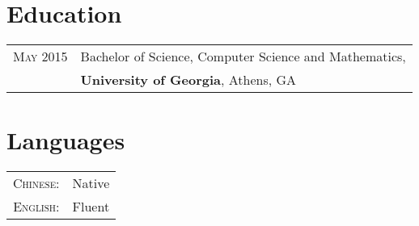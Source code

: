 \documentclass[a4paper,10pt]{article}
\begin{document}
\section{Education}
\begin{tabular}{rl}	
 \textsc{May} 2015 & Bachelor of Science, Computer Science and Mathematics, \\ &
 \textbf{University of Georgia}, Athens, GA\\
\end{tabular}

\section{Languages}
\begin{tabular}{rl}
\textsc{Chinese:}&Native\\
\textsc{English:}&Fluent\\
\end{tabular}
\end{document}
